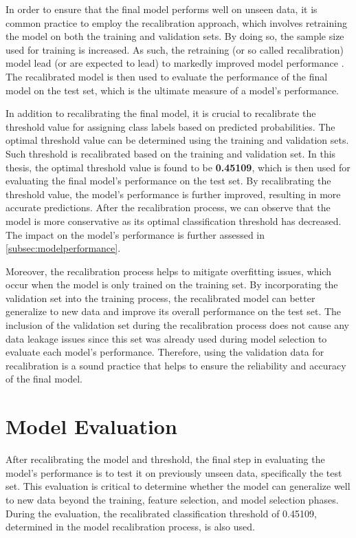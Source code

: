 In order to ensure that the final model performs well on unseen data, it is common practice to employ the recalibration approach, which involves retraining the model on both the training and validation sets.
By doing so, the sample size used for training is increased. As such, the retraining (or so called recalibration) model lead (or are expected to lead) to markedly improved model performance \citep{de2023predicting}.
The recalibrated model is then used to evaluate the performance of the final model on the test set, which is the ultimate measure of a model's performance.

In addition to recalibrating the final model, it is crucial to recalibrate the threshold value for assigning class labels based on predicted probabilities. The optimal threshold value can be determined using the training and validation sets. Such threshold is recalibrated based on the training and validation set.
In this thesis, the optimal threshold value is found to be \textbf{0.45109}, which is then used for evaluating the final model's performance on the test set.
By recalibrating the threshold value, the model's performance is further improved, resulting in more accurate predictions. After the recalibration process, we can observe that the model is more conservative as its optimal classification threshold has decreased. The impact on the model's performance is further assessed in \autoref{subsec:modelperformance}.

Moreover, the recalibration process helps to mitigate overfitting issues, which occur when the model is only trained on the training set.
By incorporating the validation set into the training process, the recalibrated model can better generalize to new data and improve its overall performance on the test set.
The inclusion of the validation set during the recalibration process does not cause any data leakage issues since this set was already used during model selection to evaluate each model's performance.
Therefore, using the validation data for recalibration is a sound practice that helps to ensure the reliability and accuracy of the final model.

\newpage
\section{Model Evaluation}
After recalibrating the model and threshold, the final step in evaluating the model's performance is to test it on previously unseen data, specifically the test set.
This evaluation is critical to determine whether the model can generalize well to new data beyond the training, feature selection, and model selection phases.
During the evaluation, the recalibrated classification threshold of 0.45109, determined in the model recalibration process, is also used.
